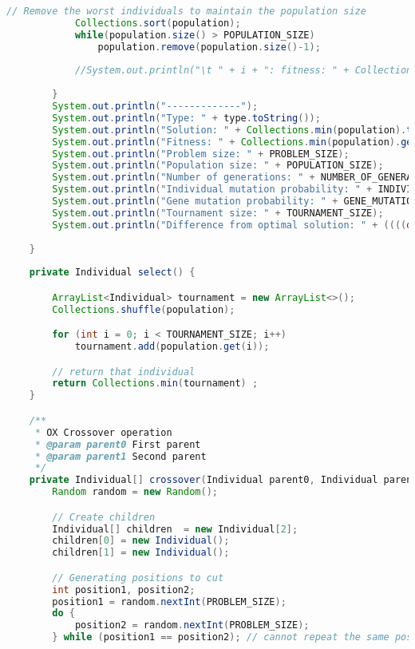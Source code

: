 \begin{lstlisting}[language=java,caption={Genetic.java},captionpos=b]
            // Remove the worst individuals to maintain the population size
            Collections.sort(population);
            while(population.size() > POPULATION_SIZE)
                population.remove(population.size()-1);
            
            //System.out.println("\t " + i + ": fitness: " + Collections.min(population).getFitness());
            
        }
        System.out.println("-------------");
        System.out.println("Type: " + type.toString());
        System.out.println("Solution: " + Collections.min(population).toString());
        System.out.println("Fitness: " + Collections.min(population).getFitness());
        System.out.println("Problem size: " + PROBLEM_SIZE);
        System.out.println("Population size: " + POPULATION_SIZE);
        System.out.println("Number of generations: " + NUMBER_OF_GENERATIONS);
        System.out.println("Individual mutation probability: " + INDIVIDUAL_MUTATION_PROBABILITY);
        System.out.println("Gene mutation probability: " + GENE_MUTATION_PROBABILITY);
        System.out.println("Tournament size: " + TOURNAMENT_SIZE);
        System.out.println("Difference from optimal solution: " + ((((double) Collections.min(population).getFitness() - optimal) / optimal) * 100) + "%");
    
    }
  
    private Individual select() {

        ArrayList<Individual> tournament = new ArrayList<>();
        Collections.shuffle(population);

        for (int i = 0; i < TOURNAMENT_SIZE; i++)
            tournament.add(population.get(i));        

        // return that individual
        return Collections.min(tournament) ;
    }

    /**
     * OX Crossover operation
     * @param parent0 First parent
     * @param parent1 Second parent
     */
    private Individual[] crossover(Individual parent0, Individual parent1) {
        Random random = new Random();

        // Create children
        Individual[] children  = new Individual[2];
        children[0] = new Individual();
        children[1] = new Individual();

        // Generating positions to cut
        int position1, position2;
        position1 = random.nextInt(PROBLEM_SIZE);
        do {
            position2 = random.nextInt(PROBLEM_SIZE);
        } while (position1 == position2); // cannot repeat the same position


\end{lstlisting}
